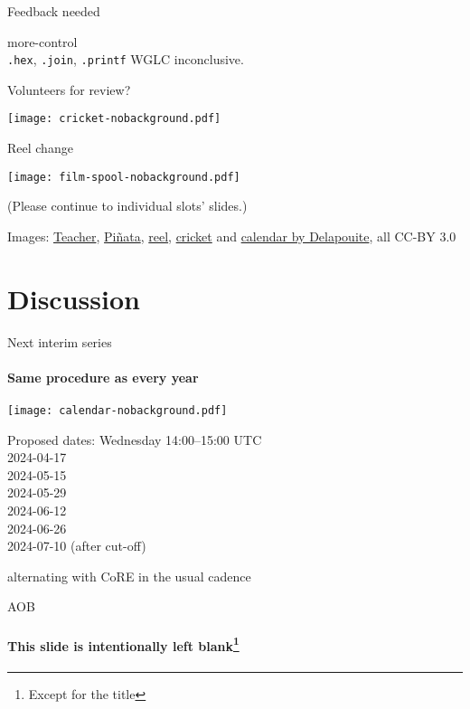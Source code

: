 \documentclass[aspectratio=169]{beamer}
\begin{document}
\begin{frame}{Feedback needed}\large
    \begin{block}{\Large more-control \\ \small \texttt{.hex}, \texttt{.join}, \texttt{.printf}}
        WGLC inconclusive.

        \bigskip

        Volunteers for review?
    \end{block}

    \vspace{2cm}

    \begin{block}{\texttt{[image: cricket-nobackground.pdf]}\mbox{\quad}}
    \end{block}

\end{frame}

\begin{frame}{Reel change}
    \begin{block}{\texttt{[image: film-spool-nobackground.pdf]}\mbox{\quad}}
        \mbox{}

        \vspace{-1.7cm}

        (Please continue to individual slots' slides.)
    \end{block}

    \vfill
    \tiny Images:
    \href{https://game-icons.net/1x1/delapouite/teacher.html}{Teacher},
    \href{https://game-icons.net/1x1/delapouite/pinata.html}{Piñata},
    \href{https://game-icons.net/1x1/delapouite/film-spool.html}{reel},
    \href{https://game-icons.net/1x1/delapouite/cricket.html}{cricket} and
    \href{https://game-icons.net/1x1/delapouite/calendar.html}{calendar by Delapouite}, all CC-BY 3.0
\end{frame}

\section*{Discussion}

\begin{frame}{Next interim series}\large
    \framesubtitle{Same procedure as every year}
    \begin{block}{\texttt{[image: calendar-nobackground.pdf]}\mbox{\quad}}
    \end{block}
    \vspace{-2cm}

    Proposed dates: Wednesday 14:00--15:00 UTC\\
    2024-04-17\\
    2024-05-15\\
    2024-05-29\\
    2024-06-12\\
    2024-06-26\\
    2024-07-10 (after cut-off)

    \bigskip

    alternating with CoRE in the usual cadence
\end{frame}

\begin{frame}{AOB}\large
    \framesubtitle{This slide is intentionally left blank\footnote{Except for the title}}
\end{frame}
\end{document}
